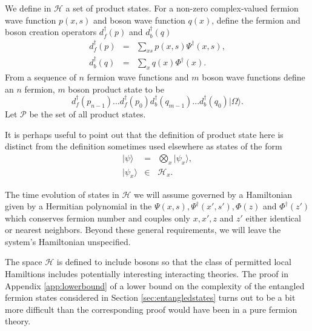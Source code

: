 \documentclass[12pt,amsmath,amssymb,onecolumn]{revtex4-2}
\begin{document}
We define in $\mathcal{H}$ a set of product states.
For a non-zero complex-valued fermion wave function $p(x, s)$ and
boson wave function $q(x)$,  define the fermion
and boson
creation operators $d_f^\dagger( p)$ and $d_b^\dagger( q)$
\begin{subequations}
\begin{eqnarray}
\label{extended}
d_f^\dagger( p) &=& \sum_{x s} p(x, s)\Psi^\dagger( x, s), \\
\label{extendedb}
d_b^\dagger( q) &=& \sum_x q(x) \Phi^\dagger( x).
\end{eqnarray}
\end{subequations}
From a sequence of $n$ fermion wave functions and $m$ boson wave functions
define an $n$ fermion, $m$ boson product state to be
\begin{equation}
\label{productstate}
d_f^\dagger( p_{n-1}) ... d_f^\dagger( p_0)d_b^\dagger( q_{m-1}) ... d_b^\dagger( q_0) |\Omega \rangle .
\end{equation}
Let $\mathcal{P}$ be the set of all product states.


It is perhaps useful to point out that the definition of product state
here is distinct from the definition sometimes
used elsewhere as states of the form
\begin{subequations}
 \begin{eqnarray}
  \label{separable}
  |\psi \rangle  &=& \bigotimes_x |\psi_x \rangle , \\
  \label{separable1}
  |\psi_x \rangle  & \in & \mathcal{H}_x.
 \end{eqnarray}
\end{subequations}

 


The time evolution of states in $\mathcal{H}$ we will assume
governed by a Hamiltonian given by a Hermitian polynomial
in the $\Psi( x, s), \Psi^\dagger( x', s'),\Phi( z)$ and $\Phi^\dagger( z')$ which conserves fermion number
and couples only $x, x', z$ and $z'$ either identical or nearest neighbors.
Beyond these general requirements, we will leave the system's
Hamiltonian unspecified.

The space $\mathcal{H}$ is defined to include bosons so that the
class of permitted local Hamiltions includes potentially
interesting interacting theories. The proof in Appendix \ref{app:lowerbound}
of a lower
bound on the complexity of the entangled fermion states
considered in Section \ref{sec:entangledstates} turns
out to be a bit more difficult than the corresponding
proof would have been in a pure fermion theory.
\end{document}
